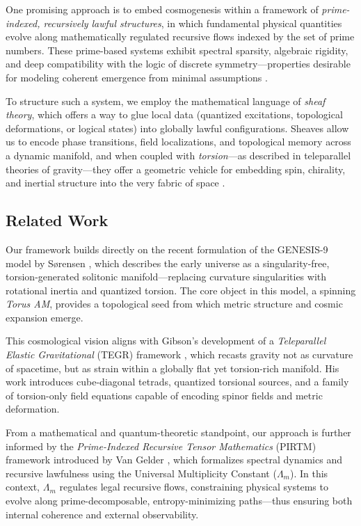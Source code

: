 \documentclass{article}
\theoremstyle{plain}
\begin{document}
One promising approach is to embed cosmogenesis within a framework of \emph{prime-indexed, recursively lawful structures}, in which fundamental physical quantities evolve along mathematically regulated recursive flows indexed by the set of prime numbers. These prime-based systems exhibit spectral sparsity, algebraic rigidity, and deep compatibility with the logic of discrete symmetry—properties desirable for modeling coherent emergence from minimal assumptions \cite{vanGelder2025PIRTM,vanGelder2025Multiplicity}.

To structure such a system, we employ the mathematical language of \emph{sheaf theory}, which offers a way to glue local data (quantized excitations, topological deformations, or logical states) into globally lawful configurations. Sheaves allow us to encode phase transitions, field localizations, and topological memory across a dynamic manifold, and when coupled with \emph{torsion}—as described in teleparallel theories of gravity—they offer a geometric vehicle for embedding spin, chirality, and inertial structure into the very fabric of space \cite{gibson2025field}.

\subsection{Related Work}

Our framework builds directly on the recent formulation of the GENESIS-9 model by Sørensen \cite{sorensen2025genesis}, which describes the early universe as a singularity-free, torsion-generated solitonic manifold—replacing curvature singularities with rotational inertia and quantized torsion. The core object in this model, a spinning \emph{Torus AM}, provides a topological seed from which metric structure and cosmic expansion emerge.

This cosmological vision aligns with Gibson’s development of a \emph{Teleparallel Elastic Gravitational} (TEGR) framework \cite{gibson2025field, gibson2025overview}, which recasts gravity not as curvature of spacetime, but as strain within a globally flat yet torsion-rich manifold. His work introduces cube-diagonal tetrads, quantized torsional sources, and a family of torsion-only field equations capable of encoding spinor fields and metric deformation.

From a mathematical and quantum-theoretic standpoint, our approach is further informed by the \emph{Prime-Indexed Recursive Tensor Mathematics} (PIRTM) framework introduced by Van Gelder \cite{vanGelder2025PIRTM}, which formalizes spectral dynamics and recursive lawfulness using the Universal Multiplicity Constant ($\Lambda_m$). In this context, $\Lambda_m$ regulates legal recursive flows, constraining physical systems to evolve along prime-decomposable, entropy-minimizing paths—thus ensuring both internal coherence and external observability.
\end{document}
